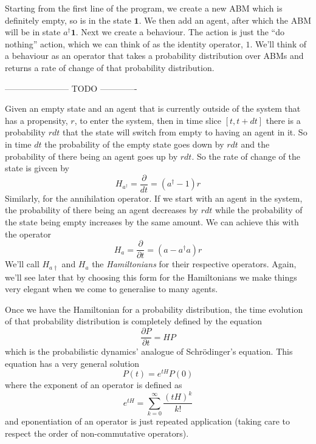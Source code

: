 \documentclass[letterpaper,twocolumn,10pt]{article}
\begin{document}
Starting from the first line of the program, we create a new ABM which is definitely empty, so is in the state $\mathbf{1}$. We then add an agent, after which the ABM will be in state $a^\dag \mathbf{1}$. Next we create a behaviour. The action is just the ``do nothing'' action, which we can think of as the identity operator, $1$. We'll think of a behaviour as an operator that takes a probability distribution over ABMs and returns a rate of change of that probability distribution.

----------------------- TODO -------------

 Given an empty state and an agent that is currently outside of the system that has a propensity, $r$, to enter the system, then in time slice $[t, t+dt]$ there is a probability $rdt$ that the state will switch from empty to having an agent in it. So in time $dt$ the probability of the empty state goes down by $rdt$ and the probability of there being an agent goes up by $rdt$. So the rate of change of the state is givcen by
\[
H_{a^\dag} = \frac{\partial}{dt} = (a^\dag - 1)r
\]
Similarly, for the annihilation operator. If we start with an agent in the system, the probability of there being an agent decreases by $rdt$ while the probability of the state being empty increases by the same amount. We can achieve this with the operator
\[
H_a = \frac{\partial}{\partial t} = (a - a^{\dag}a)r
\]
We'll call $H_{a\dag}$ and $H_a$ the \textit{Hamiltonians} for their respective operators. Again, we'll see later that by choosing this form for the Hamiltonians we make things very elegant when we come to generalise to many agents.

Once we have the Hamiltonian for a probability distribution, the time evolution of that probability distribution is completely defined by the equation
\[
\frac{\partial P}{\partial t} = HP
\]
which is the probabilistic dynamics' analogue of Schr\"{o}dinger's equation. This equation has a very general solution
\[
P(t) = e^{tH}P(0)
\]
where the exponent of an operator is defined as
\[
e^{tH} = \sum_{k=0}^\infty \frac{(tH)^k}{k!}
\]
and eponentiation of an operator is just repeated application (taking care to respect the order of non-commutative operators).
\end{document}
